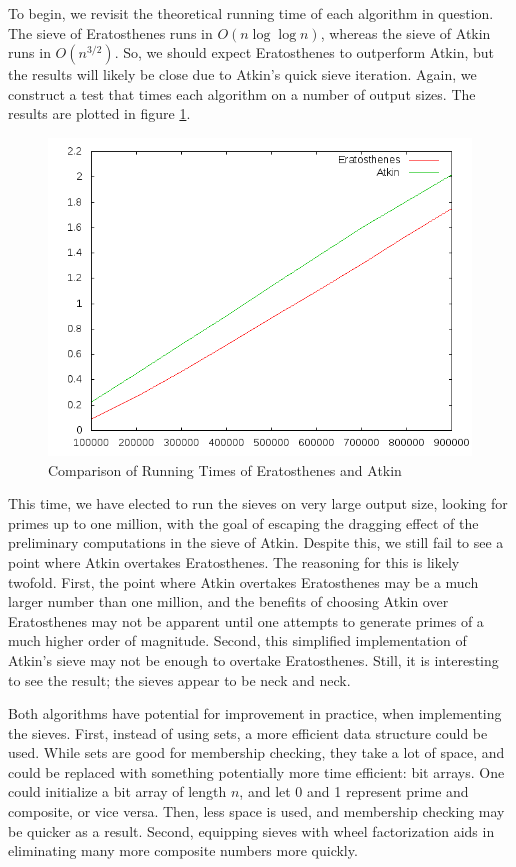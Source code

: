 \documentclass{amsart}
\theoremstyle{definition}
\theoremstyle{case}
\begin{document}
	To begin, we revisit the theoretical running time of each algorithm in question. The sieve of Eratosthenes runs in $O(n \log \log n)$, whereas the sieve of Atkin runs in $O(n^{3/2})$. So, we should expect Eratosthenes to outperform Atkin, but the results will likely be close due to Atkin's quick sieve iteration. Again, we construct a test that times each algorithm on a number of output sizes. The results are plotted in figure \ref{runtimeeratkin}.
	
	\begin{figure}\caption{Comparison of Running Times of Eratosthenes and Atkin}
		\label{runtimeeratkin}
		\includegraphics[scale=0.5]{eratkin1.png}
	\end{figure}

	This time, we have elected to run the sieves on very large output size, looking for primes up to one million, with the goal of escaping the dragging effect of the preliminary computations in the sieve of Atkin. Despite this, we still fail to see a point where Atkin overtakes Eratosthenes. The reasoning for this is likely twofold. First, the point where Atkin overtakes Eratosthenes may be a much larger number than one million, and the benefits of choosing Atkin over Eratosthenes may not be apparent until one attempts to generate primes of a much higher order of magnitude. Second, this simplified implementation of Atkin's sieve may not be enough to overtake Eratosthenes. Still, it is interesting to see the result; the sieves appear to be neck and neck.
	
	Both algorithms have potential for improvement in practice, when implementing the sieves. First, instead of using sets, a more efficient data structure could be used. While sets are good for membership checking, they take a lot of space, and could be replaced with something potentially more time efficient: bit arrays. One could initialize a bit array of length $n$, and let 0 and 1 represent prime and composite, or vice versa. Then, less space is used, and membership checking may be quicker as a result. Second, equipping sieves with wheel factorization aids in eliminating many more composite numbers more quickly.
	
\end{document}
